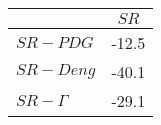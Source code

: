 \begin{tabular}{l|c}
\toprule
{} &  $SR$ \\
\midrule
\textbf{$SR-PDG$   } & -12.5 \\
\textbf{$SR-Deng$  } & -40.1 \\
\textbf{$SR-\Gamma$} & -29.1 \\
\bottomrule
\end{tabular}
